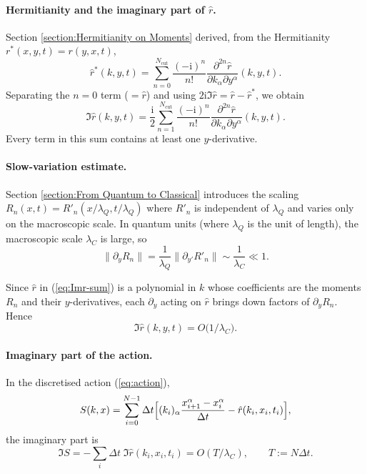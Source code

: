 \documentclass{book}
\newcommand{\assign}{:=}
\newcommand{\mathi}{\mathrm{i}}
\newcommand{\tmop}[1]{\ensuremath{\operatorname{#1}}}
\begin{document}
\paragraph{Hermitianity and the imaginary part of $\hat{r}$.}
Section \ref{section:Hermitianity on Moments} derived, from the
Hermitianity $r^{\ast} (x, y, t) = r (y, x, t)$,
\begin{equation}
  \hat{r}^{\ast} (k, y, t) = \sum_{n = 0}^{N_{\tmop{cut}}}
  \frac{(- \mathi)^n}{n!} \frac{\partial^{2 n} \hat{r}}{\partial k_{\alpha}
  \partial y^{\alpha}} (k, y, t) . \label{eq:rstar-sum}
\end{equation}
Separating the $n = 0$ term ($= \hat{r}$) and using $2 \mathi \Im \hat{r}
= \hat{r} - \hat{r}^{\ast}$, we obtain
\begin{equation}
  \Im \hat{r} (k, y, t) = \frac{\mathi}{2} \sum_{n = 1}^{N_{\tmop{cut}}}
  \frac{(- \mathi)^n}{n!} \frac{\partial^{2 n} \hat{r}}{\partial k_{\alpha}
  \partial y^{\alpha}} (k, y, t) . \label{eq:Imr-sum}
\end{equation}
Every term in this sum contains at least one $y$-derivative.

\paragraph{Slow-variation estimate.}
Section \ref{section:From Quantum to Classical} introduces the scaling
$R_n (x, t) = R'_n (x / \lambda_Q, t / \lambda_Q)$ where $R'_n$ is
independent of $\lambda_Q$ and varies only on the macroscopic scale.  In
quantum units (where $\lambda_Q$ is the unit of length), the macroscopic
scale $\lambda_C$ is large, so
\[ \| \partial_y R_n \| = \frac{1}{\lambda_Q} \| \partial_{y'} R'_n \|
   \sim \frac{1}{\lambda_C} \ll 1 . \]

Since $\hat{r}$ in (\ref{eq:Imr-sum}) is a polynomial in $k$ whose
coefficients are the moments $R_n$ and their $y$-derivatives, each
$\partial_y$ acting on $\hat{r}$ brings down factors of $\partial_y R_n$.
Hence
\begin{equation}
  \Im \hat{r} (k, y, t) = O \bigl( 1 / \lambda_C \bigr) .
  \label{eq:Imr-order}
\end{equation}

\paragraph{Imaginary part of the action.}
In the discretised action (\ref{eq:action}),
\[ S (k, x) = \sum_{i = 0}^{N - 1} \Delta t \Bigl[ (k_i)_{\alpha}
   \frac{x_{i + 1}^{\alpha} - x_i^{\alpha}}{\Delta t} -
   \hat{r} (k_i, x_i, t_i) \Bigr], \]
the imaginary part is
\[ \Im S = - \sum_i \Delta t \; \Im \hat{r} (k_i, x_i, t_i)
   = O (T / \lambda_C), \qquad T \assign N \Delta t . \]
\end{document}
